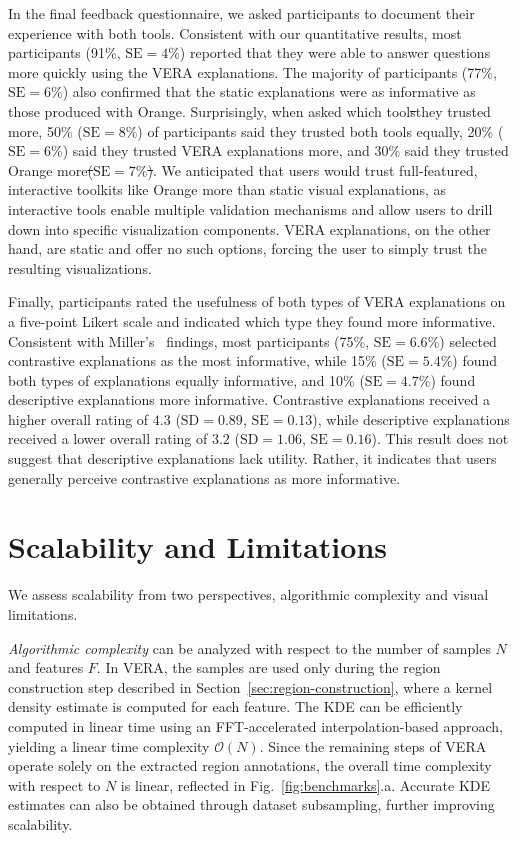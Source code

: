 \documentclass[lettersize,journal]{IEEEtran}
\makeatletter
\providecommand{\DIFadd}[1]{{\protect\color{blue}\uwave{#1}}} %
\providecommand{\DIFdel}[1]{{\protect\color{red}\sout{#1}}} %
\providecommand{\DIFaddbegin}{} %
\providecommand{\DIFaddend}{} %
\providecommand{\DIFdelbegin}{} %
\providecommand{\DIFdelend}{} %
\providecommand{\DIFscaledelfig}{0.5}
\newlength{\DIFdelgraphicswidth} %
\newlength{\DIFdelgraphicsheight} %
\providecommand{\DIFaddincludegraphics}[2][]{{\color{blue}\fbox{\DIFOincludegraphics[#1]{#2}}}} %
\providecommand{\DIFdelincludegraphics}[2][]{%
\sbox{\DIFdelgraphicsbox}{\DIFOincludegraphics[#1]{#2}}%
\settoboxwidth{\DIFdelgraphicswidth}{\DIFdelgraphicsbox} %
\settoboxtotalheight{\DIFdelgraphicsheight}{\DIFdelgraphicsbox} %
\scalebox{\DIFscaledelfig}{%
\parbox[b]{\DIFdelgraphicswidth}{\usebox{\DIFdelgraphicsbox}\\[-\baselineskip] \rule{\DIFdelgraphicswidth}{0em}}\llap{\resizebox{\DIFdelgraphicswidth}{\DIFdelgraphicsheight}{%
\setlength{\unitlength}{\DIFdelgraphicswidth}%
\begin{picture}(1,1)%
\thicklines\linethickness{2pt} %
{\color[rgb]{1,0,0}\put(0,0){\framebox(1,1){}}}%
{\color[rgb]{1,0,0}\put(0,0){\line( 1,1){1}}}%
{\color[rgb]{1,0,0}\put(0,1){\line(1,-1){1}}}%
\end{picture}%
}\hspace*{3pt}}} %
} %
\DeclareRobustCommand{\DIFaddbegin}{\DIFOaddbegin \let\includegraphics\DIFaddincludegraphics} %
\DeclareRobustCommand{\DIFaddend}{\DIFOaddend \let\includegraphics\DIFOincludegraphics} %
\DeclareRobustCommand{\DIFdelbegin}{\DIFOdelbegin \let\includegraphics\DIFdelincludegraphics} %
\DeclareRobustCommand{\DIFdelend}{\DIFOaddend \let\includegraphics\DIFOincludegraphics} %
\let\sout@orig\sout %
\renewcommand{\sout}[1]{\ifmmode\text{\sout@orig{\ensuremath{#1}}}\else\sout@orig{#1}\fi} %
\makeatother
\begin{document}
In the final feedback questionnaire, we asked participants to document their experience with both tools. Consistent with our quantitative results, most participants (91\%, $\text{SE}=4\%$) reported that they were able to answer questions more quickly using the VERA explanations. The majority of participants (77\%, $\text{SE}=6\%$) also confirmed that the static explanations were as informative as those produced with Orange.
Surprisingly, when asked which tool\DIFdelbegin \DIFdel{s}\DIFdelend  they trusted more, 50\% ($\text{SE}=8\%$) of participants said they trusted both tools equally, 20\% ($\text{SE}=6\%$) said they trusted VERA explanations more, and 30\% \DIFaddbegin \DIFadd{($\text{SE}=7\%$) }\DIFaddend said they trusted Orange more\DIFdelbegin \DIFdel{($\text{SE}=7\%$)}\DIFdelend . 
We anticipated that users would trust full-featured, interactive toolkits like Orange more than static visual explanations, as interactive tools enable multiple validation mechanisms and allow users to drill down into specific visualization components. VERA explanations, on the other hand, are static and offer no such options, forcing the user to simply trust the resulting visualizations.

Finally, participants rated the usefulness of both types of VERA explanations on a five-point Likert scale and indicated which type they found more informative. Consistent with Miller's~\cite{Miller2019} findings, most participants (75\%, $\text{SE}=6.6\%$) selected contrastive explanations as the most informative, while 15\% ($\text{SE}=5.4\%$) found both types of explanations equally informative, and 10\% ($\text{SE}=4.7\%$) found descriptive explanations more informative.
Contrastive explanations received a higher overall rating of $4.3$ ($\text{SD}= 0.89$, $\text{SE}=0.13$), while descriptive explanations received a lower overall rating of $3.2$ ($\text{SD}= 1.06$, $\text{SE}=0.16$).
This result does not suggest that descriptive explanations lack utility. Rather, it indicates that users generally perceive contrastive explanations as more informative.

\section{Scalability and Limitations}
\label{sec:scalability}

We assess scalability from two perspectives, algorithmic complexity and visual limitations.

\textit{Algorithmic complexity} can be analyzed with respect to the number of samples $N$ and features \DIFdelbegin \DIFdel{$F$}\DIFdelend \DIFaddbegin \DIFadd{$|F|$}\DIFaddend .
In VERA, the samples are used only during the region construction step described in Section~\ref{sec:region-construction}, where a kernel density estimate is computed for each feature. The KDE can be efficiently computed in linear time using an FFT-accelerated interpolation-based approach, yielding a linear time complexity $\mathcal{O}(N)$.
Since the remaining steps of VERA operate solely on the extracted region annotations, the overall time complexity with respect to $N$ is linear, reflected in Fig.~\ref{fig:benchmarks}.a. Accurate KDE estimates can also be obtained through dataset subsampling, further improving scalability.
\end{document}
